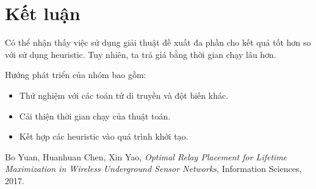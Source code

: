 \documentclass[hidelinks, 11pt, a4paper]{report}
\begin{document}
\section{Kết luận}
Có thể nhận thấy việc sử dụng giải thuật đề xuất đa phần cho kết quả tốt hơn so với sử dụng heuristic. Tuy nhiên, ta trả giá bằng thời gian chạy lâu hơn.

Hướng phát triển của nhóm bao gồm:
\begin{itemize}
    \item Thử nghiệm với các toán tử di truyền và đột biến khác.
    \item Cải thiện thời gian chạy của thuật toán.
    \item Kết hợp các heuristic vào quá trình khởi tạo.
\end{itemize}

\begin{thebibliography}{9}
 Bo Yuan, Huanhuan Chen, Xin Yao, \textit{Optimal Relay Placement for Lifetime Maximization in Wireless Underground Sensor Networks}, Information Sciences, 2017.

\end{thebibliography}
\end{document}

